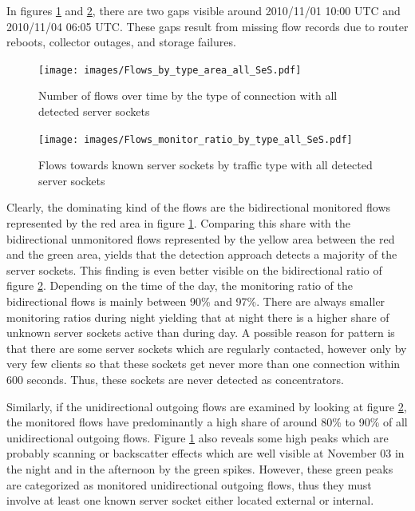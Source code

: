 In figures \ref{fig:flows_by_type} and \ref{fig:monitored_flows_by_type}, there are two gaps visible around 2010/11/01 10:00 UTC and 2010/11/04 06:05 UTC. These gaps result from missing flow records due to router reboots, collector outages, and storage failures\citep{Schatzmann:Mining}.

\begin{figure}
	[ht] \centering 
	\texttt{[image: images/Flows\_by\_type\_area\_all\_SeS.pdf]}
	\caption{Number of flows over time by the type of connection with all detected server sockets} 
	\label{fig:flows_by_type} 
\end{figure}

\begin{figure}[h]
	\centering 
	\texttt{[image: images/Flows\_monitor\_ratio\_by\_type\_all\_SeS.pdf]}
	\caption{Flows towards known server sockets by traffic type with all detected server sockets} 
	\label{fig:monitored_flows_by_type} 
\end{figure}

Clearly, the dominating kind of the flows are the bidirectional monitored flows 
represented by the red area in figure \ref{fig:flows_by_type}. Comparing this 
share with the bidirectional unmonitored flows represented by the yellow area 
between the red and the green area, yields that the detection approach detects a 
majority of the server sockets. This finding is even better visible on the 
bidirectional ratio of figure \ref{fig:monitored_flows_by_type}. Depending on 
the time of the day, the monitoring ratio of the bidirectional flows is mainly 
between 90\% and 97\%. There are always smaller monitoring ratios during night 
yielding that at night there is a higher share of unknown server sockets active 
than during day. A possible reason for pattern is that there are some server 
sockets which are regularly contacted, however only by very few clients so that 
these sockets get never more than one connection within 600 seconds. Thus, these 
sockets are never detected as concentrators. 

Similarly, if the unidirectional outgoing flows are examined by looking at figure \ref{fig:monitored_flows_by_type}, the monitored flows have predominantly a high share of around 80\% to 90\% of all unidirectional outgoing flows. Figure \ref{fig:flows_by_type} also reveals some high peaks which are probably scanning or backscatter effects which are well visible at November 03 in the night and in the afternoon by the green spikes. However, these green peaks are categorized as monitored unidirectional outgoing flows, thus they must involve at least one known server socket either located external or internal.

